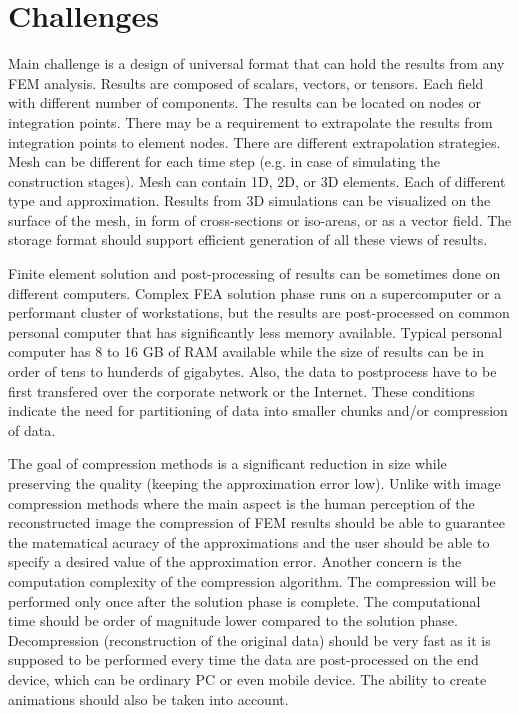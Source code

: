 \section{Challenges}

Main challenge is a design of universal format that can hold the results from any FEM analysis. Results are composed of scalars, vectors, or tensors. Each field with different number of components. The results can be located on nodes or integration points. There may be a requirement to extrapolate the results from integration points to element nodes. There are different extrapolation strategies. Mesh can be different for each time step (e.g. in case of simulating the construction stages). Mesh can contain 1D, 2D, or 3D elements. Each of different type and approximation. Results from 3D simulations can be visualized on the surface of the mesh, in form of cross-sections or iso-areas, or as a vector field. The storage format should support efficient generation of all these views of results.

Finite element solution and post-processing of results can be sometimes done on different computers. Complex FEA solution phase runs on a supercomputer or a performant cluster of workstations, but the results are post-processed on common personal computer that has significantly less memory available. Typical personal computer has 8 to 16 GB of RAM available while the size of results can be in order of tens to hunderds of gigabytes. Also, the data to postprocess have to be first transfered over the corporate network or the Internet. These conditions indicate the need for partitioning of data into smaller chunks and/or compression of data.

The goal of compression methods is a significant reduction in size while preserving the quality (keeping the approximation error low). Unlike with image compression methods where the main aspect is the human perception of the reconstructed image the compression of FEM results should be able to guarantee the matematical acuracy of the approximations and the user should be able to specify a desired value of the approximation error. Another concern is the computation complexity of the compression algorithm. The compression will be performed only once after the solution phase is complete. The computational time should be order of magnitude lower compared to the solution phase. Decompression (reconstruction of the original data) should be very fast as it is supposed to be performed every time the data are post-processed on the end device, which can be ordinary PC or even mobile device. The ability to create animations should also be taken into account.

